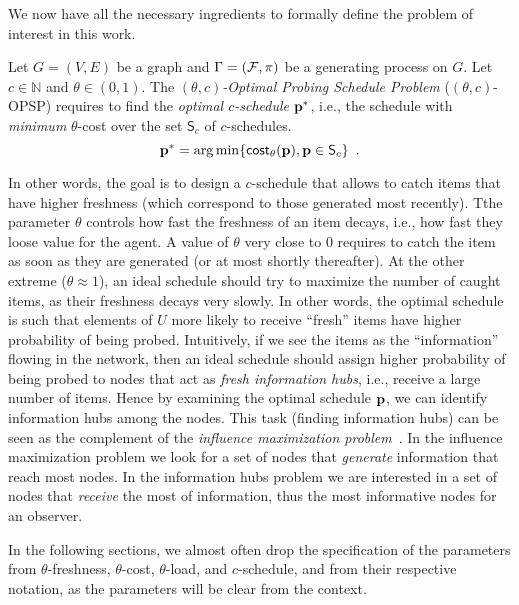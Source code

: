 We now have all the necessary ingredients to formally define the problem of
interest in this work.

 Let $G=(V,E)$ be a graph and $\Gamma=(\mathcal{F},\pi)$ be a
generating process on $G$. Let $c\in\mathbb{N}$ and
$\theta\in(0,1)$. The \emph{$(\theta,c)$-Optimal Probing Schedule Problem}
($(\theta,c)$-OPSP) requires to find the \emph{optimal $c$-schedule} $\mathbf{p}^*$,
i.e., the schedule with \emph{minimum} $\theta$-cost over the set $\mathsf{S}_c$
of $c$-schedules.
\[
	\mathbf{p}^*=\operatorname*{arg\,min}\{\mathsf{cost}_\theta(\mathbf{p}), \mathbf{p}\in\mathsf{S}_c\}\enspace.
\]

In other words, the goal is to design a $c$-schedule that allows to catch items
that have higher freshness (which correspond to those generated most recently).
Tthe parameter $\theta$ controls how fast the freshness of an item decays, i.e.,
how fast they loose value for the agent. A value of $\theta$ very close to $0$
requires to catch the item  as soon as they are generated (or at most shortly
thereafter). At the other extreme ($\theta\approx 1$), an ideal schedule should
try to maximize the number of caught items, as their freshness decays very
slowly. In other words, the optimal schedule is such that elements of $U$ more
likely to receive ``fresh'' items have higher probability of being probed.
Intuitively, if we see the items as the ``information'' flowing in the network,
then an ideal schedule should assign higher probability of being probed to nodes
that act as \emph{fresh information hubs}, i.e., receive a large number of
items. Hence by examining the optimal schedule $\mathbf{p}$, we can identify
information hubs among the nodes. This task (finding information hubs) can be
seen as the complement of the \emph{influence maximization
problem}~\citep{Kempe2003,Kempe2005}. In the influence maximization problem we
look for a set of nodes that \emph{generate} information that reach most nodes.
In the information hubs problem we are interested in a set of nodes that
\emph{receive} the most of information, thus the most informative nodes for an
observer.

In the following sections, we almost often drop the specification of the
parameters from $\theta$-freshness, $\theta$-cost, $\theta$-load, and
$c$-schedule, and from their respective notation, as the parameters will be
clear from the context.

